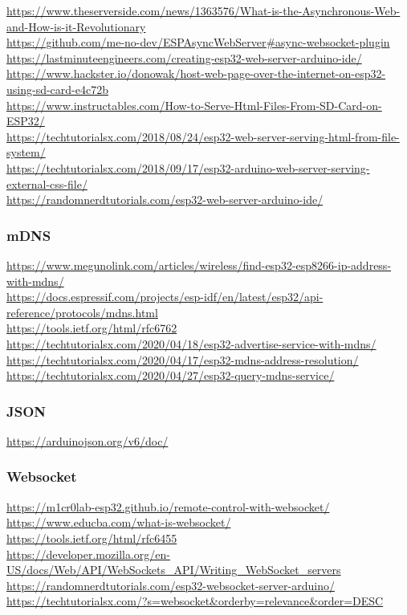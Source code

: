 \documentclass[11pt,a4paper]{article}
\begin{document}
\url{https://www.theserverside.com/news/1363576/What-is-the-Asynchronous-Web-and-How-is-it-Revolutionary}\\[4pt]
\url{https://github.com/me-no-dev/ESPAsyncWebServer#async-websocket-plugin}\\[4pt]
\url{https://lastminuteengineers.com/creating-esp32-web-server-arduino-ide/}\\[4pt]
\url{https://www.hackster.io/donowak/host-web-page-over-the-internet-on-esp32-using-sd-card-e4c72b}\\[4pt]
\url{https://www.instructables.com/How-to-Serve-Html-Files-From-SD-Card-on-ESP32/}\\[4pt]
\url{https://techtutorialsx.com/2018/08/24/esp32-web-server-serving-html-from-file-system/}\\[4pt]
\url{https://techtutorialsx.com/2018/09/17/esp32-arduino-web-server-serving-external-css-file/}\\[4pt]
\url{https://randomnerdtutorials.com/esp32-web-server-arduino-ide/}

\subsubsection{mDNS}

\url{https://www.megunolink.com/articles/wireless/find-esp32-esp8266-ip-address-with-mdns/}\\[4pt]
\url{https://docs.espressif.com/projects/esp-idf/en/latest/esp32/api-reference/protocols/mdns.html}\\[4pt]
\url{https://tools.ietf.org/html/rfc6762}\\[4pt]
\url{https://techtutorialsx.com/2020/04/18/esp32-advertise-service-with-mdns/}\\[4pt]
\url{https://techtutorialsx.com/2020/04/17/esp32-mdns-address-resolution/}\\[4pt]
\url{https://techtutorialsx.com/2020/04/27/esp32-query-mdns-service/}

\subsubsection{JSON}

\url{https://arduinojson.org/v6/doc/}

\subsubsection{Websocket}

\url{https://m1cr0lab-esp32.github.io/remote-control-with-websocket/}\\[4pt]
\url{https://www.educba.com/what-is-websocket/}\\[4pt]
\url{https://tools.ietf.org/html/rfc6455}\\[4pt]
\url{https://developer.mozilla.org/en-US/docs/Web/API/WebSockets_API/Writing_WebSocket_servers}\\[4pt]
\url{https://randomnerdtutorials.com/esp32-websocket-server-arduino/}\\[4pt]
\url{https://techtutorialsx.com/?s=websocket&orderby=relevance&order=DESC}
\end{document}
